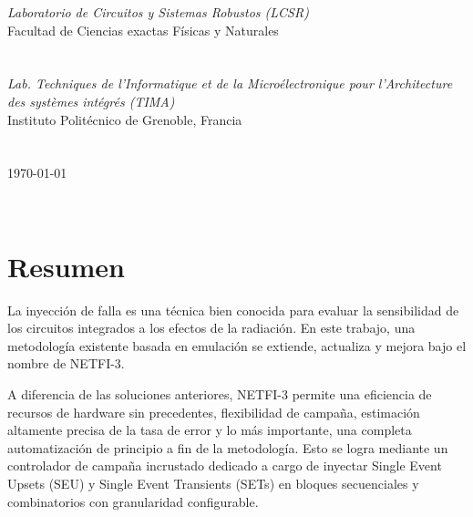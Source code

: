 \documentclass[a4paper,openright,12pt]{report}
\begin{document}
\begin{titlepage}
\begin{center}
\begin{table}[H]
\end{table}

\large \textit{Laboratorio de Circuitos y Sistemas Robustos (LCSR)}\\ Facultad de Ciencias exactas Físicas y Naturales
\large \textit{}\\
\large \textit{}\\
\large \textit{}\\
\large \textit{ Lab. Techniques de l'Informatique et de la Microélectronique pour l'Architecture des systèmes intégrés (TIMA)}\\ Instituto Politécnico de Grenoble, Francia
 \large \textit{}\\
  \large \textit{}\\
   \large \textit{}\\
{\large \today}\\[2cm] %
 
\vfill
\end{center}
\end{titlepage}


$\ $
\thispagestyle{empty} %
% 



\chapter*{Resumen} %
La inyección de falla es una técnica bien conocida para evaluar la sensibilidad de los circuitos integrados a los efectos de la radiación. En este trabajo, una metodología existente basada en emulación se extiende, actualiza y mejora bajo el nombre de \mbox{NETFI-3}. 

A diferencia de las soluciones anteriores, \mbox{NETFI-3} permite una eficiencia de recursos de hardware sin precedentes, flexibilidad de campaña, estimación altamente precisa de la tasa de error y lo más importante, una completa automatización de principio a fin de la metodología.
Esto se logra mediante un controlador de campaña incrustado dedicado a cargo de inyectar Single Event Upsets (SEU) y Single Event Transients (SETs) en bloques secuenciales y combinatorios con granularidad configurable. 
\end{document}
